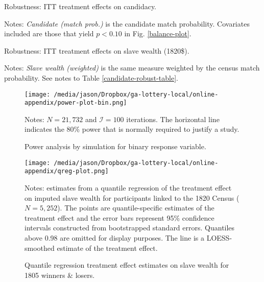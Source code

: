 \begin{table}[htbp] 
	\begin{center}
		\caption{Robustness: ITT treatment effects on candidacy.}   \label{candidate-robust-table}
		\resizebox{0.9\width}{!}{}
	\end{center}
	\footnotesize{Notes: \textit{Candidate (match prob.)} is the candidate match probability. Covariates included are those that yield $p <0.10$ in Fig. \ref{balance-plot}.}  
\end{table}  

\begin{table}[htbp] 
	\begin{center}
		\caption{Robustness: ITT treatment effects on slave wealth (1820\$).}   \label{slave-robust-table}
		\resizebox{0.9\width}{!}{}
	\end{center}
	\footnotesize{Notes: \textit{Slave wealth (weighted)} is the same measure weighted by the census match probability. See notes to Table \ref{candidate-robust-table}.}  
\end{table}   

\begin{figure}[htbp] %
	\begin{center}
		\caption{Power analysis by simulation for binary response variable.\label{power-plot-bin}}		
		\texttt{[image: /media/jason/Dropbox/ga-lottery-local/online-appendix/power-plot-bin.png]} 
	\end{center}
	\footnotesize{Notes: $N=21,732$ and $\mathcal{I} =100$ iterations. The horizontal line indicates the 80\% power that is normally required to justify a study.}
\end{figure}

\begin{figure}[htbp] %
	\begin{center}
		\caption{Quantile regression treatment effect estimates on slave wealth for 1805 winners \& losers. \label{qreg-plot} }
		\texttt{[image: /media/jason/Dropbox/ga-lottery-local/online-appendix/qreg-plot.png]} \\
	\end{center}
	\footnotesize{Notes: estimates from a quantile regression of the treatment effect on imputed slave wealth for participants linked to the 1820 Census ($N=5,252$). The points are quantile-specific estimates of the treatment effect and the error bars represent 95\% confidence intervals constructed from bootstrapped standard errors. Quantiles above 0.98 are omitted for display purposes. The line is a LOESS-smoothed estimate of the treatment effect.}
\end{figure}
